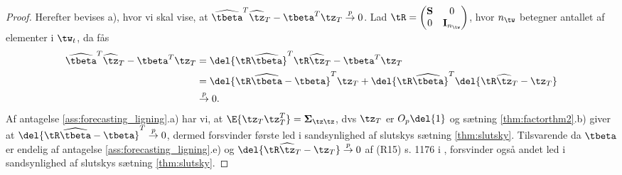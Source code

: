 \begin{proof}
Herefter bevises a), hvor vi skal vise, at \(\widehat{\tbeta}^T \widehat{\tz}_T - \tbeta^T \tz_T \overset{p}{\rightarrow} 0\).
Lad \(\tR = \begin{pmatrix}
\mathbf{S} & 0 \\ 0 & \mathbf{I}_{n_{\tw}}
\end{pmatrix}\), hvor \(n_{\tw}\) betegner antallet af elementer i \(\tw_t\), da fås
\begin{align*}
\widehat{\tbeta}^T \widehat{\tz}_T - \tbeta^T \tz_T &= \del{\tR \widehat{\tbeta}}^T \tR \widehat{\tz}_T - \tbeta^T \tz_T \\
&= \del{\tR \widehat{\tbeta} - \tbeta}^T \tz_T + \del{\tR \widehat{\tbeta}}^T \del{\tR \widehat{\tz}_T - \tz_T} \\
&\overset{p}{\rightarrow} 0.
\end{align*}
Af antagelse \ref{ass:forecasting_ligning}.a) har vi, at \(\E{\tz_T \tz_T^T} = \boldsymbol{\Sigma}_{\tz \tz}\), dvs \(\tz_T\) er \(O_p \del{1}\) og sætning \ref{thm:factorthm2}.b) giver at \(\del{\tR \widehat{\tbeta} - \tbeta}^T \overset{p}{\rightarrow} 0\), dermed forsvinder første led i sandsynlighed af slutskys sætning \ref{thm:slutsky}.
Tilsvarende da \(\tbeta\) er endelig af antagelse \ref{ass:forecasting_ligning}.e) og \(\del{\tR \widehat{\tz}_T - \tz_T} \overset{p}{\rightarrow} 0\) af (R15) s. 1176 i \citep{stock_watson_2002a}, forsvinder også andet led i sandsynlighed af slutskys sætning \ref{thm:slutsky}. 
\end{proof}

